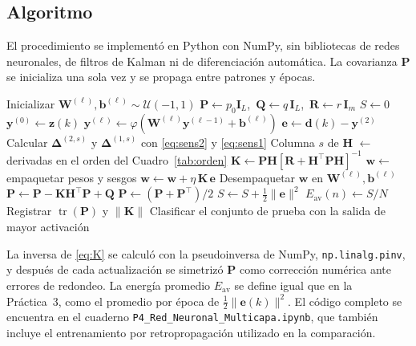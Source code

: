 \documentclass[conference]{IEEEtran}
\begin{document}
\subsection{Algoritmo}
El procedimiento se implementó en Python con NumPy, sin bibliotecas de
redes neuronales, de filtros de Kalman ni de diferenciación automática. La
covarianza $\mathbf{P}$ se inicializa una sola vez y se propaga entre
patrones y épocas.
\begin{algorithmic}[1]
\STATE Inicializar $\mathbf{W}^{(\ell)},\mathbf{b}^{(\ell)}\sim\mathcal{U}(-1,1)$
\STATE $\mathbf{P}\leftarrow p_0\mathbf{I}_{L}$,\ $\mathbf{Q}\leftarrow q\,\mathbf{I}_{L}$,\ $\mathbf{R}\leftarrow r\,\mathbf{I}_{m}$
    \STATE $S\leftarrow0$
        \STATE $\mathbf{y}^{(0)}\leftarrow\mathbf{z}(k)$
            \STATE $\mathbf{y}^{(\ell)}\leftarrow\varphi(\mathbf{W}^{(\ell)}\mathbf{y}^{(\ell-1)}+\mathbf{b}^{(\ell)})$
        \ENDFOR
        \STATE $\mathbf{e}\leftarrow\mathbf{d}(k)-\mathbf{y}^{(2)}$
            \STATE Calcular $\boldsymbol{\Delta}^{(2,s)}$ y $\boldsymbol{\Delta}^{(1,s)}$ con \eqref{eq:sens2} y \eqref{eq:sens1}
            \STATE Columna $s$ de $\mathbf{H}$ $\leftarrow$ derivadas en el orden del Cuadro~\ref{tab:orden}
        \ENDFOR
        \STATE $\mathbf{K}\leftarrow\mathbf{P}\mathbf{H}\left[\mathbf{R}+\mathbf{H}^\top\mathbf{P}\mathbf{H}\right]^{-1}$
        \STATE $\mathbf{w}\leftarrow$ empaquetar pesos y sesgos
        \STATE $\mathbf{w}\leftarrow\mathbf{w}+\eta\,\mathbf{K}\,\mathbf{e}$
        \STATE Desempaquetar $\mathbf{w}$ en $\mathbf{W}^{(\ell)},\mathbf{b}^{(\ell)}$
        \STATE $\mathbf{P}\leftarrow\mathbf{P}-\mathbf{K}\mathbf{H}^\top\mathbf{P}+\mathbf{Q}$
        \STATE $\mathbf{P}\leftarrow(\mathbf{P}+\mathbf{P}^\top)/2$
        \STATE $S\leftarrow S+\tfrac{1}{2}\|\mathbf{e}\|^2$
    \ENDFOR
    \STATE $E_{\text{av}}(n)\leftarrow S/N$
    \STATE Registrar $\operatorname{tr}(\mathbf{P})$ y $\|\mathbf{K}\|$
\ENDFOR
\STATE Clasificar el conjunto de prueba con la salida de mayor activación
\end{algorithmic}
La inversa de \eqref{eq:K} se calculó con la pseudoinversa de NumPy,
\texttt{np.linalg.pinv}, y después de cada actualización se simetrizó
$\mathbf{P}$ como corrección numérica ante errores de redondeo. La energía
promedio $E_{\text{av}}$ se define igual que en la Práctica~3, como el
promedio por época de $\tfrac{1}{2}\|\mathbf{e}(k)\|^2$. El código completo
se encuentra en el cuaderno \texttt{P4\_Red\_Neuronal\_Multicapa.ipynb}, que
también incluye el entrenamiento por retropropagación utilizado en la
comparación.
\end{document}
